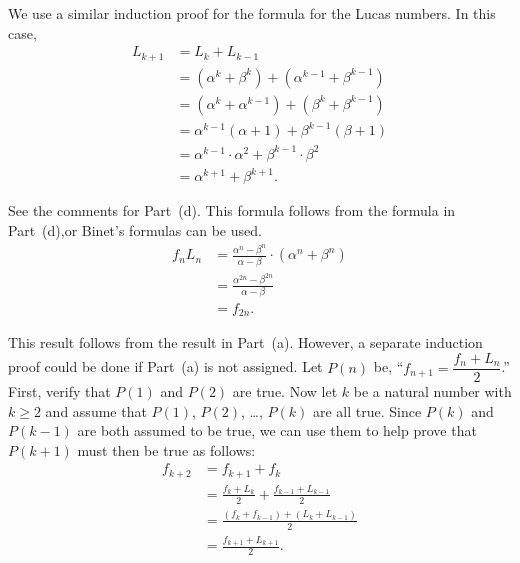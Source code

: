 \vskip6pt
We use a similar induction proof for the formula for the Lucas numbers.  In this case,
\begin{align*}
L_{k+1} &= L_k + L_{k-1} \\
        &= \left( \alpha^k + \beta^k \right) + \left( \alpha^{k-1} + \beta^{k-1} \right) \\
        &= \left( \alpha^k + \alpha^{k-1} \right) + \left( \beta^k + \beta^{k-1} \right) \\
        &= \alpha^{k-1}(\alpha + 1) + \beta^{k-1}(\beta + 1) \\
        &= \alpha^{k-1} \cdot \alpha^2 + \beta^{k-1} \cdot \beta^2 \\
        &= \alpha^{k + 1} + \beta^{k + 1}.
\end{align*}


\item See the comments for Part~(d).  This formula follows from the formula in Part~(d),or Binet's formulas can be used.
\begin{align*}
f_n L_n &= \frac{\alpha^n - \beta^n}{\alpha - \beta} \cdot \left( \alpha^n + \beta^n \right) \\
        &= \frac{\alpha^{2n} - \beta^{2n}}{\alpha - \beta} \\
        &= f_{2n}.
\end{align*}

\item This result follows from the result in Part~(a).  However, a separate induction proof could be done if Part~(a) is not assigned.  Let $P(n)$ be, 
``$f_{n+1} = \dfrac{f_n + L_n}{2}$.''  First, verify that $P(1)$ and $P(2)$ are true.  Now let 
$k$ be a natural number with $k \geq 2$ and assume that $P(1)$, $P(2)$, \ldots, 
$P(k)$ are all true. Since $P(k)$ and $P(k-1)$ are both assumed to be true, we can use them to help prove that $P(k+1)$ must then be true as follows:
\begin{align*}
f_{k + 2} &= f_{k+1} + f_k \\
          &= \frac{f_k + L_k}{2} + \frac{f_{k-1} + L_{k-1}}{2} \\
          &= \frac{\left( f_k + f_{k-1} \right) + \left( L_k + L_{k-1} \right)}{2} \\
          &= \frac{f_{k+1} + L_{k+1}}{2}.
\end{align*}


